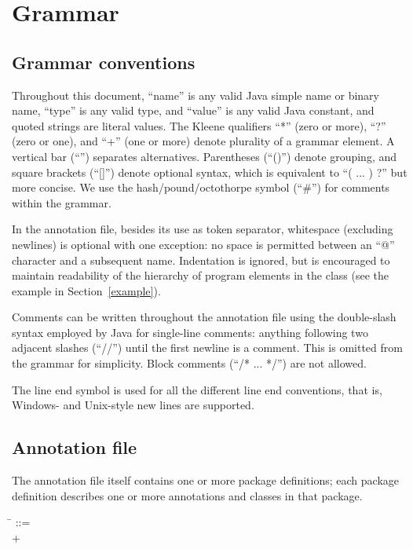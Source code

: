 \documentclass{article}
\begin{document}
\section{Grammar\label{grammar}}

\subsection{Grammar conventions\label{grammar-conventions}}

Throughout this document, ``name'' is any valid Java simple name or 
binary name, ``type'' is any valid type, and ``value'' is any
valid Java constant, and quoted strings are literal values.
%
The Kleene qualifiers ``*'' (zero or more), ``?'' (zero or one), and ``+''
(one or more) denote plurality of a grammar element.
%
A vertical bar (``\bnfor'') separates alternatives.
Parentheses (``()'') denote grouping, and square brackets (``[]'')
denote optional syntax, which is equivalent to ``( ... ) ?'' but more concise.
We use the hash/pound/octothorpe symbol (``\#'') for comments within the grammar. 

In the annotation file,
besides its use as token separator, 
whitespace (excluding
newlines) is optional with one exception: no space is permitted
between an ``@'' character and a subsequent name. Indentation is
ignored, but is encouraged to maintain readability of the hierarchy of
program elements in the class (see the example in Section~\ref{example}).

Comments can be written throughout the annotation file using the double-slash
syntax employed by Java for single-line comments: anything following
two adjacent slashes (``//'') until the first newline is a comment.
This is omitted from the grammar for simplicity.
Block comments (``/* ... */'') are not allowed.

The line end symbol \lineend{} is used for all the different line end
conventions, that is, Windows- and Unix-style new lines are supported.



\subsection{Annotation file\label{annotation-file}}

The annotation file itself contains one or more
package definitions; each package definition describes one or more
annotations and classes in that package.

\begin{tabbing}
\qquad \= \kill
{} ::= \\
\qquad    {}+
\end{tabbing}
\end{document}
